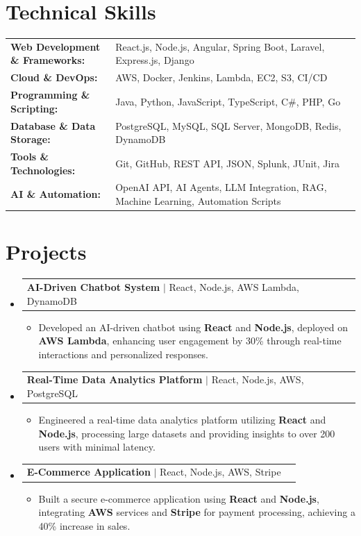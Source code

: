 \documentclass[letterpaper,10pt]{article}
\makeatletter
\newcommand{\resumeItem}[1]{
  \item{\fontsize{8pt}{9pt}\selectfont
    #1 \vspace{-3pt}
  }
}
\newcommand{\resumeProjectHeading}[2]{
    \item
    \begin{tabular*}{1.001\textwidth}{l@{\extracolsep{\fill}}r}
      \fontsize{8.5pt}{10pt}#1 & \textbf{\fontsize{8.5pt}{10pt} #2}\\
    \end{tabular*}\vspace{-7pt}
}
\newcommand{\resumeSubHeadingListStart}{\begin{itemize}[leftmargin=0pt, label={}]}
\newcommand{\resumeSubHeadingListEnd}{\end{itemize}}
\newcommand{\resumeItemListStart}{\begin{itemize}[leftmargin=*]}
\newcommand{\resumeItemListEnd}{\end{itemize}\vspace{-5pt}}
\makeatother
\begin{document}
\section{Technical Skills}
        \vspace{-14pt}
        \begin{table}[h]
            \fontsize{8pt}{9pt}\selectfont
            \begin{tabular}{p{0.3\linewidth} p{0.7\linewidth}}
                \textbf{Web Development \& Frameworks:} & React.js, Node.js, Angular, Spring Boot, Laravel, Express.js, Django \\
                \textbf{Cloud \& DevOps:} & AWS, Docker, Jenkins, Lambda, EC2, S3, CI/CD \\
                \textbf{Programming \& Scripting:} & Java, Python, JavaScript, TypeScript, C\#, PHP, Go \\
                \textbf{Database \& Data Storage:} & PostgreSQL, MySQL, SQL Server, MongoDB, Redis, DynamoDB \\
                \textbf{Tools \& Technologies:} & Git, GitHub, REST API, JSON, Splunk, JUnit, Jira \\
                \textbf{AI \& Automation:} & OpenAI API, AI Agents, LLM Integration, RAG, Machine Learning, Automation Scripts \\
            \end{tabular}
        \end{table}
 \vspace{-18pt}

\section{Projects}
    \vspace{-5pt}
    \resumeSubHeadingListStart
          \resumeProjectHeading
            {\textbf{AI-Driven Chatbot System} $|$ React, Node.js, AWS Lambda, DynamoDB}{}
            \resumeItemListStart
                \resumeItem{Developed an AI-driven chatbot using \textbf{React} and \textbf{Node.js}, deployed on \textbf{AWS Lambda}, enhancing user engagement by 30\% through real-time interactions and personalized responses.}
            \resumeItemListEnd
        \vspace{-12pt}
    
        \resumeProjectHeading
            {\textbf{Real-Time Data Analytics Platform} $|$ React, Node.js, AWS, PostgreSQL}{}
        \resumeItemListStart
                \resumeItem{Engineered a real-time data analytics platform utilizing \textbf{React} and \textbf{Node.js}, processing large datasets and providing insights to over 200 users with minimal latency.}
        \resumeItemListEnd
      \vspace{-12pt}
      \resumeProjectHeading
        {\textbf{E-Commerce Application} $|$ React, Node.js, AWS, Stripe}{}
    \resumeItemListStart
            \resumeItem{Built a secure e-commerce application using \textbf{React} and \textbf{Node.js}, integrating \textbf{AWS} services and \textbf{Stripe} for payment processing, achieving a 40\% increase in sales.}
    \resumeItemListEnd
    \resumeSubHeadingListEnd
\end{document}
